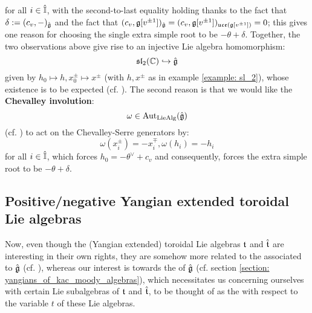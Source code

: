         for all $i \in \hat{\mathbb{I}}$, with the second-to-last equality holding thanks to the fact that $\delta := (c_v, -)_{\hat{\mathfrak{g}}}$ and the fact that $(c_v, \mathfrak{g}[v^{\pm 1}])_{\hat{\mathfrak{g}}} = (c_v, \mathfrak{g}[v^{\pm 1}])_{\mathfrak{uce}(\mathfrak{g}[v^{\pm 1}])} = 0$; this gives one reason for choosing the single extra simple root to be $-\theta + \delta$. Together, the two observations above give rise to an injective Lie algebra homomorphism:
            $$\mathfrak{sl}_2(\mathbb{C}) \hookrightarrow \hat{\mathfrak{g}}$$
        given by $h_0 \mapsto h, x_0^{\pm} \mapsto x^{\pm}$ (with $h, x^{\pm}$ as in example \ref{example: sl_2}), whose existence is to be expected (cf. \cite[Section 3.3]{kac_infinite_dimensional_lie_algebras}). The second reason is that we would like the \textbf{Chevalley involution}:
            $$\omega \in \mathrm{Aut}_{\mathrm{Lie}\mathrm{Alg}}(\hat{\mathfrak{g}})$$
        (cf. \cite[p. 7]{kac_infinite_dimensional_lie_algebras}) to act on the Chevalley-Serre generators by:
            $$\omega(x_i^{\pm}) = -x_i^{\mp}, \omega(h_i) = -h_i$$
        for all $i \in \hat{\mathbb{I}}$, which forces $h_0 = -\theta^{\vee} + c_v$ and consequently, forces the extra simple root to be $-\theta + \delta$.
        

    \subsection{Positive/negative Yangian extended toroidal Lie algebras}
        Now, even though the  (Yangian extended) toroidal Lie algebras $\mathfrak{t}$ and $\hat{\mathfrak{t}}$ are interesting in their own rights, they are somehow more related to the  associated to $\hat{\mathfrak{g}}$ (cf. \cite[Subsection 2.3 and Section 6]{wendlandt_formal_shift_operators_on_yangian_doubles}), whereas our interest is towards the  of $\hat{\mathfrak{g}}$ (cf. section \ref{section: yangians_of_kac_moody_algebras}), which necessitates us concerning ourselves with certain Lie subalgebras of $\mathfrak{t}$ and $\hat{\mathfrak{t}}$, to be thought of as the  with respect to the variable $t$ of these Lie algebras. 

